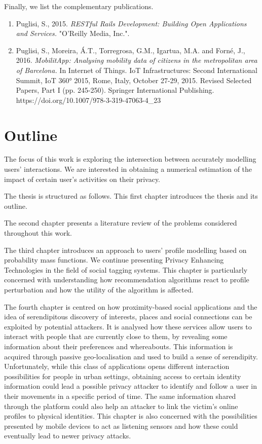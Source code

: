 Finally, we list the complementary publications.

\begin{enumerate}
    \item Puglisi, S., 2015. \emph{RESTful Rails Development: Building Open Applications and Services.} "O'Reilly Media, Inc.". 
    
    \item Puglisi, S., Moreira, \'A.T., Torregrosa, G.M., Igartua, M.A. and Forn\'e, J., 2016. \emph{MobilitApp: Analysing mobility data of citizens in the metropolitan area of Barcelona.} In Internet of Things. IoT Infrastructures: Second International Summit, IoT 360° 2015, Rome, Italy, October 27-29, 2015. Revised Selected Papers, Part I (pp. 245-250). Springer International Publishing. https://doi.org/10.1007/978-3-319-47063-4\_23
\end{enumerate}

\section{Outline}

The focus of this work is exploring the intersection between accurately modelling users' interactions. We are interested in obtaining a numerical estimation of the impact of certain user’s activities on their privacy. 

The thesis is structured as follows. This first chapter introduces the thesis and its outline.
 
The second chapter presents a literature review of the problems considered throughout this work.

The third chapter introduces an approach to users' profile modelling based on probability mass functions. We continue presenting Privacy Enhancing Technologies in the field of social tagging systems. This chapter is particularly concerned with understanding how recommendation algorithms react to profile perturbation and how the utility of the algorithm is affected.

The fourth chapter is centred on how proximity-based social applications and the idea of serendipitous discovery of interests, places and social connections can be exploited by potential attackers. It is analysed how these services allow users to interact with people that are currently close to them, by revealing some information about their preferences and whereabouts. This information is acquired through passive geo-localisation and used to build a sense of serendipity. Unfortunately, while this class of applications opens different interaction possibilities for people in urban settings, obtaining access to certain identity information could lead a possible privacy attacker to identify and follow a user in their movements in a specific period of time. The same information shared through the platform could also help an attacker to link the victim’s online profiles to physical identities. This chapter is also concerned with the possibilities presented by mobile devices to act as listening sensors and how these could eventually lead to newer privacy attacks.

